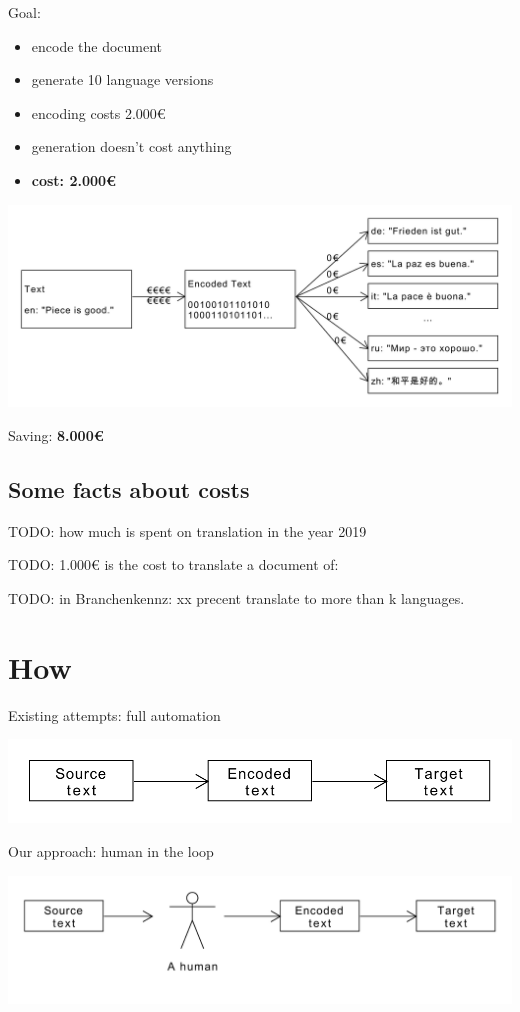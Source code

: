 \documentclass{article}
\begin{document}
Goal:
\begin{itemize}
\item encode the document
\item generate 10 language versions
\item encoding costs 2.000€
\item generation doesn't cost anything
\item \textbf{cost: 2.000€}
\end{itemize}

\includegraphics[scale=0.4]{dia/user-view-tokimani.pdf}

Saving: \textbf{8.000€}

\subsection{Some facts about costs}
TODO: how much is spent on translation in the year 2019

TODO: 1.000€ is the cost to translate a document of: 

TODO: in Branchenkennz: xx precent translate to more than k languages.

\section{How}

Existing attempts: full automation

\includegraphics[scale=0.5]{dia/how-current-world.pdf}

Our approach: human in the loop

\includegraphics[scale=0.5]{dia/how-tokimani.pdf}
\end{document}
